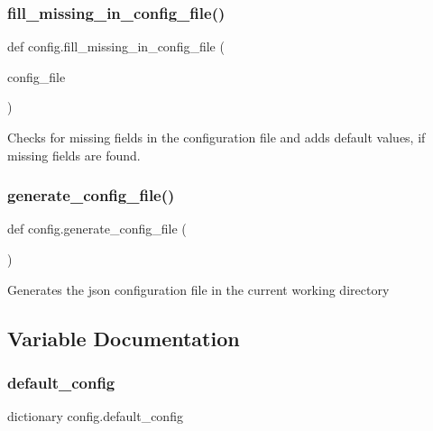 \subsubsection{\texorpdfstring{fill\+\_\+missing\+\_\+in\+\_\+config\+\_\+file()}{fill\_missing\_in\_config\_file()}}
{\footnotesize\ttfamily def config.\+fill\+\_\+missing\+\_\+in\+\_\+config\+\_\+file (\begin{DoxyParamCaption}\item[{}]{config\+\_\+file }\end{DoxyParamCaption})}

\begin{DoxyVerb}Checks for missing fields in the configuration file and adds default values, if missing fields are found.\end{DoxyVerb}
 \mbox{\label{namespaceconfig_a8e5e09166a67c11eb868143f4e85607f}} 
\subsubsection{\texorpdfstring{generate\+\_\+config\+\_\+file()}{generate\_config\_file()}}
{\footnotesize\ttfamily def config.\+generate\+\_\+config\+\_\+file (\begin{DoxyParamCaption}{ }\end{DoxyParamCaption})}

\begin{DoxyVerb}Generates the json configuration file in the current working directory \end{DoxyVerb}
 

\subsection{Variable Documentation}
\mbox{\label{namespaceconfig_ac321195dcb6ced179a85db093e63a1c9}} 
\subsubsection{\texorpdfstring{default\+\_\+config}{default\_config}}
{\footnotesize\ttfamily dictionary config.\+default\+\_\+config}

